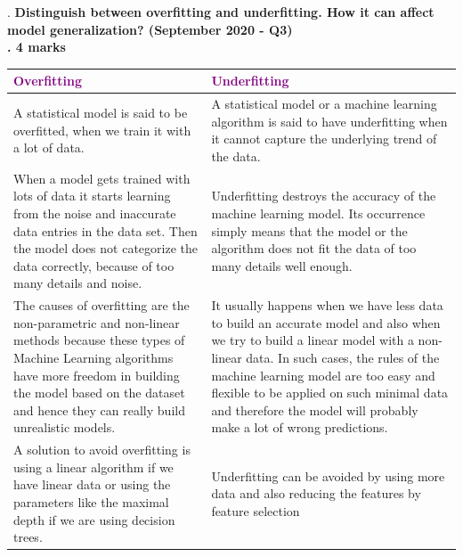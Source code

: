 .
\textbf{\textcolor{LightMagenta}{Distinguish between overfitting and underfitting. How it can affect model generalization? (September 2020 - Q3)
 \\. \hfill 4 marks}} \\[5pt]
 
\begin{tabular}{|p{7cm}|p{7cm}|}
    \hline
    \textcolor{purple}{Overfitting} & \textcolor{purple}{Underfitting}  \\ 
    \hline
    A statistical model is said to be overfitted, when we train it with a lot of data. & 
    A statistical model or a machine learning algorithm is said to have underfitting when it cannot capture the underlying trend of the data. \\
    \hline 
    
    When a model gets trained with lots of data it starts learning from the noise and inaccurate data entries in the data set. Then the model does not categorize the data correctly, because of too many details and noise. &
    Underfitting destroys the accuracy of the machine learning model. Its occurrence simply means that the model or the algorithm does not fit the data of too many details well enough.\\
    \hline
    
    The causes of overfitting are the non-parametric and non-linear methods because these types of Machine Learning algorithms have more freedom in building the model based on the dataset and hence they can really build unrealistic models. &
    It usually happens when we have less data to build an accurate model and also when we try to build a linear model with a non-linear data. In such cases, the rules of the machine learning model are too easy and flexible to be applied on such minimal data and therefore the model will probably make a lot of wrong predictions. \\
    \hline
    
    \hline
    A solution to avoid overfitting is using a linear algorithm if we have linear data or using the parameters like the maximal depth if we are using decision trees.& 
    Underfitting can be avoided by using more data and also reducing the features by feature selection\\
\hline
\end{tabular}

